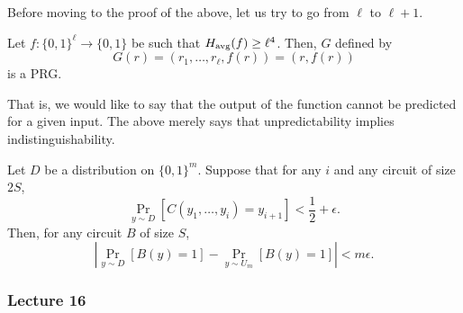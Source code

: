 		Before moving to the proof of the above, let us try to go from $\ell$ to $\ell+1$.

		\begin{prop}
			Let $f : \{0,1\}^\ell \to \{0,1\}$ be such that $H_{\text{avg}}(f) \ge \ell^4$. Then, $G$ defined by
			\[ G(r) = (r_1,\ldots,r_\ell,f(r)) = (r,f(r)) \]
			is a PRG.
		\end{prop}
		That is, we would like to say that the output of the function cannot be predicted for a given input. The above merely says that unpredictability implies indistinguishability.



		\begin{ftheo}
			\label{yao}
			Let $D$ be a distribution on $\{0,1\}^m$. Suppose that for any $i$ and any circuit of size $2S$,
			\[ \Pr_{y \sim D} [C(y_1,\ldots,y_i) = y_{i+1}] < \frac{1}{2} + \epsilon. \]
			Then, for any circuit $B$ of size $S$,
			\[ \left| \Pr_{y \sim D} [B(y) = 1] - \Pr_{y \sim U_m}[B(y) = 1] \right| < m\epsilon. \]
		\end{ftheo}

	\subsubsection{Lecture 16}

